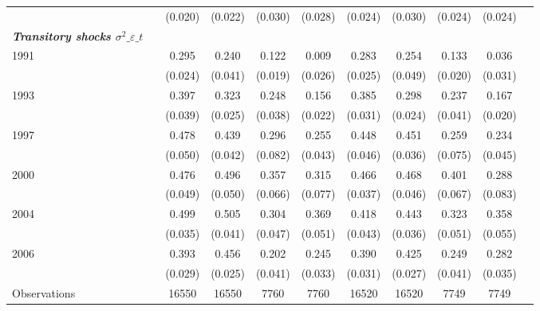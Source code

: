 \begin{tabular}{l*{10}{c}}
                    &            &     (0.020)&     (0.022)&     (0.030)&     (0.028)&     (0.024)&     (0.030)&     (0.024)&     (0.024)\\
\textbf{\emph{Transitory shocks $\sigma^2\_{\varepsilon\_t}$}}&            &            &            &            &            &            &            &            &            \\
\hspace{.3cm} 1991  &            &       0.295&       0.240&       0.122&       0.009&       0.283&       0.254&       0.133&       0.036\\
                    &            &     (0.024)&     (0.041)&     (0.019)&     (0.026)&     (0.025)&     (0.049)&     (0.020)&     (0.031)\\
\hspace{.3cm} 1993  &            &       0.397&       0.323&       0.248&       0.156&       0.385&       0.298&       0.237&       0.167\\
                    &            &     (0.039)&     (0.025)&     (0.038)&     (0.022)&     (0.031)&     (0.024)&     (0.041)&     (0.020)\\
\hspace{.3cm} 1997  &            &       0.478&       0.439&       0.296&       0.255&       0.448&       0.451&       0.259&       0.234\\
                    &            &     (0.050)&     (0.042)&     (0.082)&     (0.043)&     (0.046)&     (0.036)&     (0.075)&     (0.045)\\
\hspace{.3cm} 2000  &            &       0.476&       0.496&       0.357&       0.315&       0.466&       0.468&       0.401&       0.288\\
                    &            &     (0.049)&     (0.050)&     (0.066)&     (0.077)&     (0.037)&     (0.046)&     (0.067)&     (0.083)\\
\hspace{.3cm} 2004  &            &       0.499&       0.505&       0.304&       0.369&       0.418&       0.443&       0.323&       0.358\\
                    &            &     (0.035)&     (0.041)&     (0.047)&     (0.051)&     (0.043)&     (0.036)&     (0.051)&     (0.055)\\
\hspace{.3cm} 2006  &            &       0.393&       0.456&       0.202&       0.245&       0.390&       0.425&       0.249&       0.282\\
                    &            &     (0.029)&     (0.025)&     (0.041)&     (0.033)&     (0.031)&     (0.027)&     (0.041)&     (0.035)\\
\midrule
Observations        &            &       16550&       16550&        7760&        7760&       16520&       16520&        7749&        7749\\
\bottomrule
\end{tabular}
